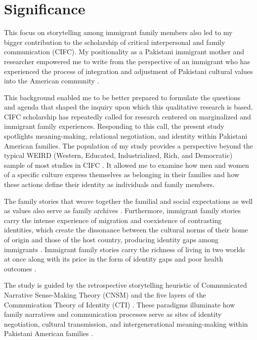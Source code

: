 \section{Significance}

This focus on storytelling among immigrant family members also led to my bigger contribution to the scholarship of critical interpersonal and family communication (CIFC). My positionality as a Pakistani immigrant mother and researcher empowered me to write from the perspective of an immigrant who has experienced the process of integration and adjustment of Pakistani cultural values into the American community \citep{farooqPoeticAutoethnographyPath2025a}. 

This background enabled me to be better prepared to formulate the questions and agenda that shaped the inquiry upon which this qualitative research is based. CIFC scholarship has repeatedly called for research centered on marginalized and immigrant family experiences. Responding to this call, the present study spotlights meaning-making, relational negotiation, and identity within Pakistani American families. The population of my study provides a perspective beyond the typical WEIRD (Western, Educated, Industrialized, Rich, and Democratic) sample of most studies in CIFC \citep{manningHammerCriticalTurn2021, suterTaleTwoMommies2016}. It allowed me to examine how men and women of a specific culture express themselves as belonging in their families and how these actions define their identity as individuals and family members. 

The family stories that weave together the familial and social expectations as well as values also serve as family archives \citep{koenigkellasFamilyStoriesStorytelling2012}. Furthermore, immigrant family stories carry the intense experience of migration and coexistence of contrasting identities, which create the dissonance between the cultural norms of their home of origin and those of the host country, producing identity gaps among immigrants \citep{shinCommunicationTheoryIdentity2017, jungElaboratingCommunicationTheory2004}. Immigrant family stories carry the richness of living in two worlds at once along with its price in the form of identity gaps and poor health outcomes \citep{koenigkellasCommunicatedNarrativeSenseMaking2022, shinCommunicationTheoryIdentity2017}.

The study is guided by the retrospective storytelling heuristic of Communicated Narrative Sense-Making Theory (CNSM) and the five layers of the Communication Theory of Identity (CTI) \citep{hecht2002ResearchOdyssey1993, kuiperCommunicationTheoryIdentity2021}. These paradigms illuminate how family narratives and communication processes serve as sites of identity negotiation, cultural transmission, and intergenerational meaning-making within Pakistani American families \citep{hecht2002ResearchOdyssey1993, kuiperCommunicationTheoryIdentity2021, koenigkellasCommunicatedNarrativeSenseMaking2018}. 

